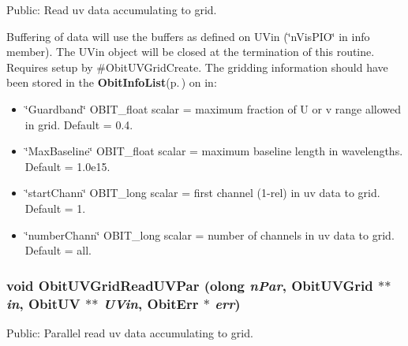 Public: Read uv data accumulating to grid. 

Buffering of data will use the buffers as defined on UVin (\char`\"{}n\-Vis\-PIO\char`\"{} in info member). The UVin object will be closed at the termination of this routine. Requires setup by \#Obit\-UVGrid\-Create. The gridding information should have been stored in the {\bf Obit\-Info\-List}{\rm (p.\,\pageref{structObitInfoList})} on in: \begin{itemize}
\item \char`\"{}Guardband\char`\"{} OBIT\_\-float scalar = maximum fraction of U or v range allowed in grid. Default = 0.4. \item \char`\"{}Max\-Baseline\char`\"{} OBIT\_\-float scalar = maximum baseline length in wavelengths. Default = 1.0e15. \item \char`\"{}start\-Chann\char`\"{} OBIT\_\-long scalar = first channel (1-rel) in uv data to grid. Default = 1. \item \char`\"{}number\-Chann\char`\"{} OBIT\_\-long scalar = number of channels in uv data to grid. Default = all. 
\end{itemize}
\subsubsection{\setlength{\rightskip}{0pt plus 5cm}void Obit\-UVGrid\-Read\-UVPar ({\bf olong} {\em n\-Par}, {\bf Obit\-UVGrid} $\ast$$\ast$ {\em in}, {\bf Obit\-UV} $\ast$$\ast$ {\em UVin}, {\bf Obit\-Err} $\ast$ {\em err})}\label{ObitUVGrid_8h_a13}


Public: Parallel read uv data accumulating to grid. 

